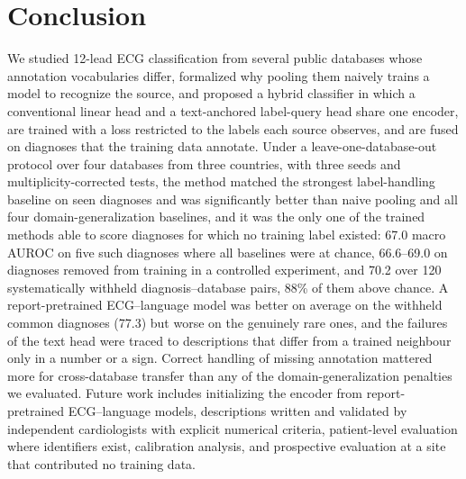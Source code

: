 \section{Conclusion}\label{sec:conclusion}
We studied 12-lead ECG classification from several public databases whose annotation vocabularies differ, formalized why pooling them naively trains a model to recognize the source, and proposed a hybrid classifier in which a conventional linear head and a text-anchored label-query head share one encoder, are trained with a loss restricted to the labels each source observes, and are fused on diagnoses that the training data annotate. Under a leave-one-database-out protocol over four databases from three countries, with three seeds and multiplicity-corrected tests, the method matched the strongest label-handling baseline on seen diagnoses and was significantly better than naive pooling and all four domain-generalization baselines, and it was the only one of the trained methods able to score diagnoses for which no training label existed: 67.0 macro AUROC on five such diagnoses where all baselines were at chance, 66.6--69.0 on diagnoses removed from training in a controlled experiment, and 70.2 over 120 systematically withheld diagnosis--database pairs, 88\% of them above chance. A report-pretrained ECG--language model was better on average on the withheld common diagnoses (77.3) but worse on the genuinely rare ones, and the failures of the text head were traced to descriptions that differ from a trained neighbour only in a number or a sign. Correct handling of missing annotation mattered more for cross-database transfer than any of the domain-generalization penalties we evaluated. Future work includes initializing the encoder from report-pretrained ECG--language models, descriptions written and validated by independent cardiologists with explicit numerical criteria, patient-level evaluation where identifiers exist, calibration analysis, and prospective evaluation at a site that contributed no training data.
